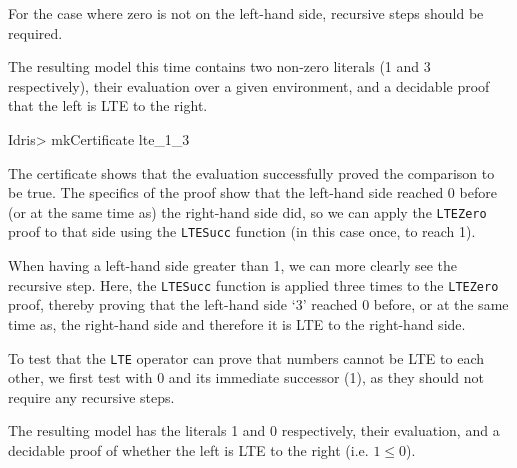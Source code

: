         \newpage
        
        
        
        For the case where zero is not on the left-hand side, recursive steps should be required.
        
        
        The resulting model this time contains two non-zero literals (1 and 3 respectively), their evaluation over a given environment, and a decidable proof that the left is LTE to the right.
        
        \begin{code}
            Idris> mkCertificate lte_1_3
        \end{code}
        
        The certificate shows that the evaluation successfully proved the comparison to be true. The specifics of the proof show that the left-hand side reached 0 before (or at the same time as) the right-hand side did, so we can apply the \texttt{LTEZero} proof to that side using the \texttt{LTESucc} function (in this case once, to reach 1).
        
        
        When having a left-hand side greater than 1, we can more clearly see the recursive step. Here, the \texttt{LTESucc} function is applied three times to the \texttt{LTEZero} proof, thereby proving that the left-hand side `3' reached 0 before, or at the same time as, the right-hand side and therefore it is LTE to the right-hand side.
        
        
        
        To test that the \texttt{LTE} operator can prove that numbers cannot be LTE to each other, we first test with 0 and its immediate successor (1), as they should not require any recursive steps.
        
        
        The resulting \Idris model has the literals 1 and 0 respectively, their evaluation, and a decidable proof of whether the left is LTE to the right (i.e. $1 \leq 0$).
        
